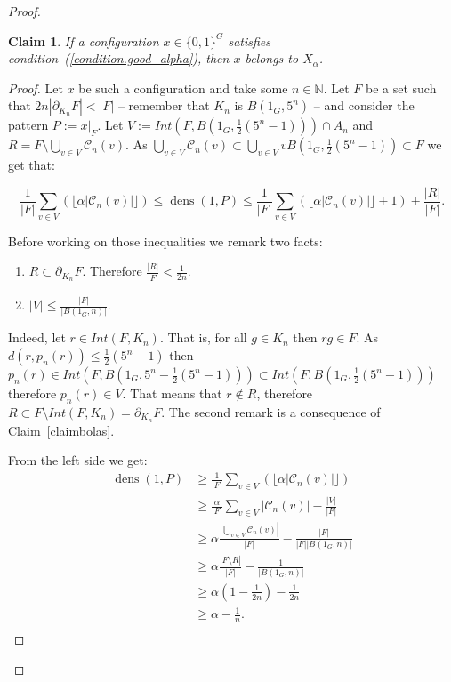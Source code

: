 \documentclass[letterpaper]{article}
\theoremstyle{plain}
\newtheorem{claim}{Claim}[section]
\def\NN{\mathbb{N}}
\def\CC{\mathcal{C}}
\def\dens{\operatorname{dens}}
\begin{document}
\begin{proof}
		\begin{claim}\label{claim.condition_implies_alpha}
			If a configuration $x\in\{0,1\}^G$ satisfies condition~(\ref{condition.good_alpha}), then $x$ belongs to $X_{\alpha}$.
		\end{claim}
		\begin{proof}
			Let $x$ be such a configuration and take some $n\in\NN$. Let $F$ be a set such that $2n|\partial_{K_n}F| < |F|$ -- remember that $K_n$ is $B(1_G,5^n)$ -- and consider the pattern $P := x|_{F}$. Let $V := Int(F,B(1_G,\frac{1}{2}(5^n-1))) \cap A_n$ and $R = F \setminus \bigcup_{v \in V}\CC_n(v)$. As $\bigcup_{v \in V}\CC_n(v) \subset  \bigcup_{v \in V}vB(1_G,\frac{1}{2}(5^n-1)) \subset F$ we get that:
			
			$$\frac{1}{|F|}\sum_{v \in V}(\lfloor \alpha|\CC_{n}(v)| \rfloor) \leq  \dens(1,P) \leq  \frac{1}{|F|}\sum_{v \in V}(\lfloor \alpha|\CC_{n}(v)| \rfloor +1) + \frac{|R|}{|F|}.$$
			
			Before working on those inequalities we remark two facts:
			
			\begin{enumerate}
				\item $R \subset \partial_{K_n}F$. Therefore $\frac{|R|}{|F|} < \frac{1}{2n}$.
				\item $ |V| \leq \frac{|F|}{|B(1_G,n)|}$.
			\end{enumerate}
			Indeed, let $r \in Int(F,K_n)$. That is, for all $g \in K_n$ then $rg \in F$. As $d(r,p_n(r)) \leq \frac{1}{2}(5^n-1)$ then $p_n(r) \in Int(F,B(1_G,5^n-\frac{1}{2}(5^n-1))) \subset Int(F,B(1_G,\frac{1}{2}(5^n-1)))$ therefore $p_n(r) \in V$. That means that $r \notin R$, therefore $R \subset F \setminus Int(F,K_n) = \partial_{K_n}F$. The second remark is a consequence of Claim~\ref{claimbolas}.	
			
			From the left side we get:\begin{align*}
				\dens(1,P)&  \geq  \frac{1}{|F|}\sum_{v \in V}(\lfloor \alpha|\CC_{n}(v)| \rfloor) \\
				& \geq \frac{\alpha}{|F|}\sum_{v \in V}|\CC_{n}(v)| - \frac{|V|}{|F|} \\
				& \geq \alpha\frac{|\bigcup_{v \in V}\CC_{n}(v)|}{|F|}- \frac{|F|}{|F||B(1_G,n)|} \\
				& \geq \alpha\frac{|F \setminus R|}{|F|}- \frac{1}{|B(1_G,n)|} \\
				& \geq \alpha(1-\frac{1}{2n}) - \frac{1}{2n} \\
				& \geq \alpha-\frac{1}{n}.\\
			\end{align*}
			

\end{proof}
\end{proof}
\end{document}

